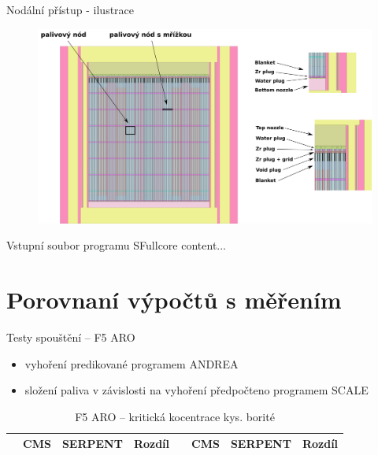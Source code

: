 \documentclass{beamer}
\begin{document}


\begin{frame}{Nodální přístup - ilustrace}
\begin{figure}
	\centering
	\includegraphics[scale=0.35]{img/reactor_axial_schema.png}
\end{figure}
\end{frame}

\begin{frame}{Vstupní soubor programu SFullcore}
	content...
\end{frame}


\section{Porovnaní výpočtů s měřením}


\begin{frame}{Testy spouštění -- F5 ARO}

\begin{itemize}\footnotesize
	\item vyhoření predikované programem ANDREA
	\item složení paliva v závislosti na vyhoření předpočteno programem SCALE 
\end{itemize}

\begin{table}[h]\scriptsize
	\begin{center}
		\begin{tabular}{cccc|cccc}
			\toprule
			& CMS     & SERPENT & Rozdíl & & CMS & SERPENT & Rozdíl \\
			\midrule
			
			\bottomrule
		\end{tabular}
		\caption{\footnotesize F5 ARO -- kritická kocentrace kys. borité}
	\end{center}
\end{table}
\end{frame}
\end{document}
